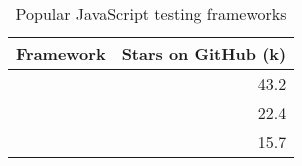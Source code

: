 \begin{table}[ht]
\centering
\caption{Popular JavaScript testing frameworks}
\label{tab:githubTestingFrameworks}
\begin{tabular}[t]{|l|r|}
\toprule
Framework & Stars on GitHub (k)\\
\midrule
\cite{githubJest} & 43.2\\
\cite{githubMocha} & 22.4\\
\cite{githubJasmine} & 15.7\\
\bottomrule
\end{tabular}
\end{table}
